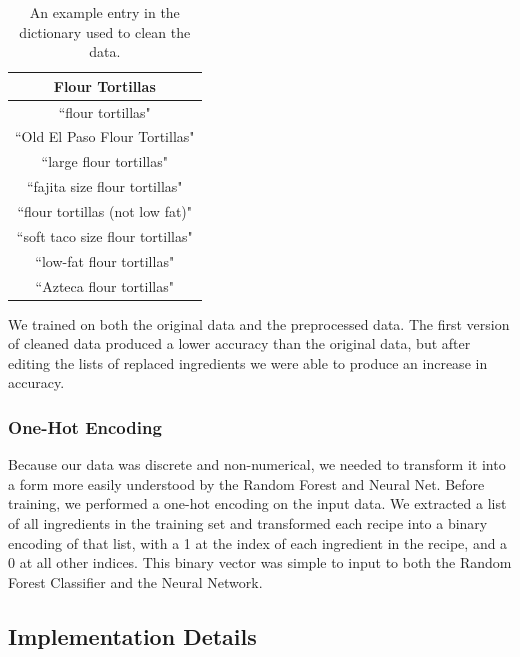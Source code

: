 \documentclass[11pt]{article}
\begin{document}
\begin{table}
\centering
    \begin{tabular}{| c |}
      \hline
      Flour Tortillas \\
      \hline
      ``flour tortillas" \\
      ``Old El Paso Flour Tortillas" \\
      ``large flour tortillas" \\
      ``fajita size flour tortillas" \\
      ``flour tortillas (not low fat)" \\
      ``soft taco size flour tortillas" \\
      ``low-fat flour tortillas" \\
      ``Azteca flour tortillas" \\
      \hline
    \end{tabular}
    \caption{\label{tab:Table2}An example entry in the dictionary used to clean the data.}
\end{table}

We trained on both the original data and the preprocessed data.
The first version of cleaned
data produced a lower accuracy than the original data, but after editing the lists of replaced ingredients we were able to produce an increase in accuracy.

\subsubsection{One-Hot Encoding}
\indent Because our data was discrete and non-numerical, we needed to transform it
into a form more easily understood by the Random Forest and Neural Net.
Before training, we performed a one-hot encoding on the input data. We extracted a list of all ingredients in the training set and transformed each recipe into a binary encoding of that list, with a 1 at the index of each ingredient in the recipe, and a 0 at all other indices. This binary vector was simple to input to both the Random Forest Classifier and the Neural Network.

\subsection{Implementation Details}
\end{document}
